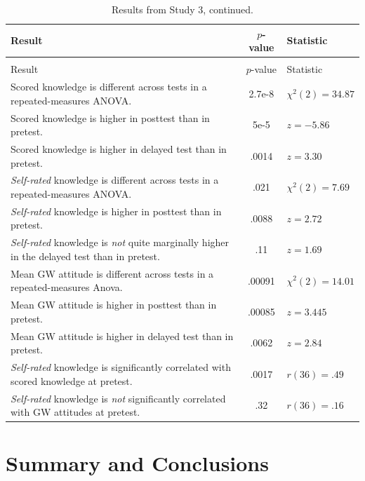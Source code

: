 \begin{longtabu}{X[2.5]S[table-parse-only]X[l]}

\caption{Summary of results from Study 3.\label{table:CCO-mech-results}}\\ 
\toprule
Result & {$p$-value} & Statistic \\ \midrule
\endfirsthead

\caption[]{Results from Study 3, continued.}\\
\toprule
Result & {$p$-value} & Statistic \\ \midrule
\endhead

\bottomrule
\endfoot

Scored knowledge is different across tests in a repeated-measures ANOVA. &
2.7e-8 & $\chi^2(2)=34.87$  \\
Scored knowledge is higher in posttest than in pretest. & 
5e-5 & $z=-5.86$ \\
Scored knowledge is higher in delayed test than in pretest. & 
.0014 & $z=3.30$ \\
\emph{Self-rated} knowledge is different across tests in a repeated-measures ANOVA. &
.021 & $\chi^2(2)=7.69$ \\
\emph{Self-rated} knowledge is higher in posttest than in pretest. & 
.0088 & $z=2.72$ \\
\emph{Self-rated} knowledge is \emph{not} quite marginally higher in the delayed test than in
pretest. & 
.11 & $z=1.69$ \\
Mean GW attitude is different across tests in a repeated-measures Anova. &
.00091 & $\chi^2(2)=14.01$ \\
Mean GW attitude is higher in posttest than in pretest. & 
.00085 & $z=3.445$ \\
Mean GW attitude is higher in delayed test than in pretest. & 
.0062 & $z=2.84$ \\
\emph{Self-rated} knowledge is significantly correlated with scored knowledge at
pretest. & 
.0017 & $r(36)=.49$ \\
\emph{Self-rated} knowledge is \emph{not} significantly correlated with GW attitudes at
pretest. & 
.32 & $r(36)=.16$ \\

\end{longtabu}

\section{Summary and Conclusions}

